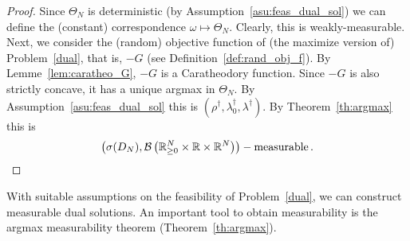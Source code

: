 \begin{proof}
  Since $\Theta_N$ is deterministic (by Assumption~\ref{asu:feas_dual_sol})
  we can define the (constant) correspondence
  $\omega \mapsto \Theta_N$.
  Clearly, this is weakly-measurable.
  Next, we consider the (random) objective function of (the maximize version of) Problem~\ref{dual}, that is, $-G$ (see Definition~\ref{def:rand_obj_f}).
  By Lemme~\ref{lem:caratheo_G}, $-G$  is a Caratheodory function.
  Since $-G$ is also strictly concave, it has a unique argmax in $\Theta_N$.
  By Assumption~\ref{asu:feas_dual_sol} this is 
  $
  \left( \rho^\dagger,\lambda_0^\dagger,\lambda^\dagger \right)
  $.
  By Theorem~\ref{th:argmax} this is
  \begin{align*}
  \left(
    \sigma
    (D_N)
    ,\mathcal{B}
  \left(
  \mathbb{R}^N_{\ge 0}
  \times
  \mathbb{R}
  \times
  \mathbb{R}^{N}
  \right)
  \right)
  -\text{measurable}
  \,.
  \end{align*}
\end{proof}

\begin{takeaways}
  With suitable assumptions on the feasibility of Problem~\ref{dual}, we can construct measurable dual solutions.
  An important tool to obtain measurability is the argmax measurability theorem (Theorem~\ref{th:argmax}).
\end{takeaways}
